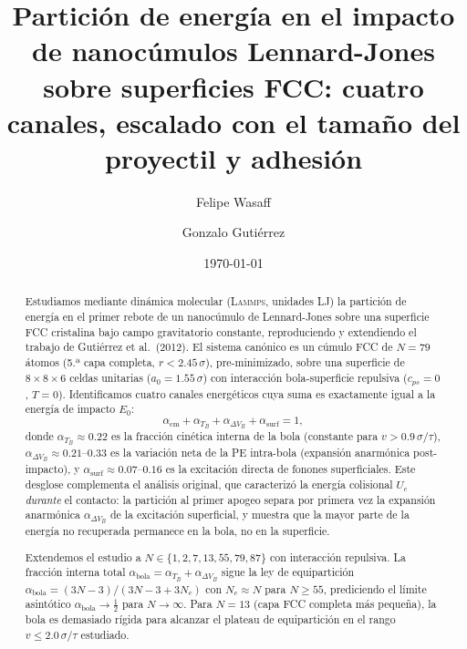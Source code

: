 \documentclass[aps,pre,twocolumn,reprint,superscriptaddress]{revtex4-2}
\newcommand{\lammps}{\textsc{Lammps}}
\begin{document}
\title{Partición de energía en el impacto de nanocúmulos Lennard-Jones
sobre superficies FCC: cuatro canales, escalado con el tamaño del
proyectil y adhesión}

\author{Felipe Wasaff}

\author{Gonzalo Gutiérrez}

\date{\today}

\begin{abstract}
Estudiamos mediante dinámica molecular (\lammps, unidades LJ) la partición de
energía en el primer rebote de un nanocúmulo de Lennard-Jones sobre una
superficie FCC cristalina bajo campo gravitatorio constante, reproduciendo y
extendiendo el trabajo de Gutiérrez et al.\ (2012). El sistema canónico es un
cúmulo FCC de $N=79$ átomos (5.ª capa completa, $r < 2.45\,\sigma$),
pre-minimizado, sobre una superficie de $8\times8\times6$ celdas unitarias
($a_0=1.55\,\sigma$) con interacción bola-superficie repulsiva ($c_{ps}=0$,
$T=0$). Identificamos cuatro canales energéticos cuya suma es exactamente
igual a la energía de impacto $E_0$:
\[
    \alpha_{\mathrm{cm}} + \alpha_{T_B} + \alpha_{\Delta V_B}
    + \alpha_{\mathrm{surf}} = 1,
\]
donde $\alpha_{T_B}\approx0.22$ es la fracción cinética interna de la bola
(constante para $v>0.9\,\sigma/\tau$), $\alpha_{\Delta V_B}\approx0.21$--$0.33$
es la variación neta de la PE intra-bola (expansión anarmónica post-impacto),
y $\alpha_{\mathrm{surf}}\approx0.07$--$0.16$ es la excitación directa de
fonones superficiales. Este desglose complementa el análisis original, que
caracterizó la energía colisional $U_c$ \emph{durante} el contacto: la
partición al primer apogeo separa por primera vez la expansión anarmónica
$\alpha_{\Delta V_B}$ de la excitación superficial, y muestra que la mayor
parte de la energía no recuperada permanece en la bola, no en la superficie.

Extendemos el estudio a $N\in\{1,2,7,13,55,79,87\}$ con interacción repulsiva.
La fracción interna total $\alpha_{\mathrm{bola}}=\alpha_{T_B}+\alpha_{\Delta V_B}$
sigue la ley de equipartición $\alpha_{\mathrm{bola}}=(3N-3)/(3N-3+3N_c)$ con
$N_c\approx N$ para $N\geq55$, prediciendo el límite asintótico
$\alpha_{\mathrm{bola}}\to\tfrac{1}{2}$ para $N\to\infty$.
Para $N=13$ (capa FCC completa más pequeña), la bola es demasiado rígida para
alcanzar el plateau de equipartición en el rango $v\leq2.0\,\sigma/\tau$ estudiado.


\end{abstract}
\end{document}
